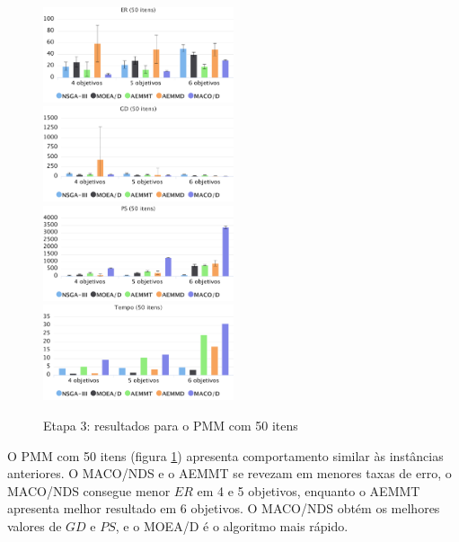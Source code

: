\begin{figure}[!htbp]
	\caption{Etapa 3: resultados para o PMM com 50 itens}
	\label{fig_exp3_pmm_50}
	\includegraphics[width=0.5\textwidth]{cap_experimentos/figs/etapa3/er-mkp-50}
	\includegraphics[width=0.5\textwidth]{cap_experimentos/figs/etapa3/gd-mkp-50}
	\includegraphics[width=0.5\textwidth]{cap_experimentos/figs/etapa3/ps-mkp-50}
	\includegraphics[width=0.5\textwidth]{cap_experimentos/figs/etapa3/time-mkp-50}
\end{figure}

O PMM com 50 itens (figura \ref{fig_exp3_pmm_50}) apresenta comportamento similar às instâncias anteriores. O MACO/NDS e o AEMMT se revezam em menores taxas de erro, o MACO/NDS consegue menor $ER$ em 4 e 5 objetivos, enquanto o AEMMT apresenta melhor resultado em 6 objetivos. O MACO/NDS obtém os melhores valores de $GD$ e $PS$, e o MOEA/D é o algoritmo mais rápido.

